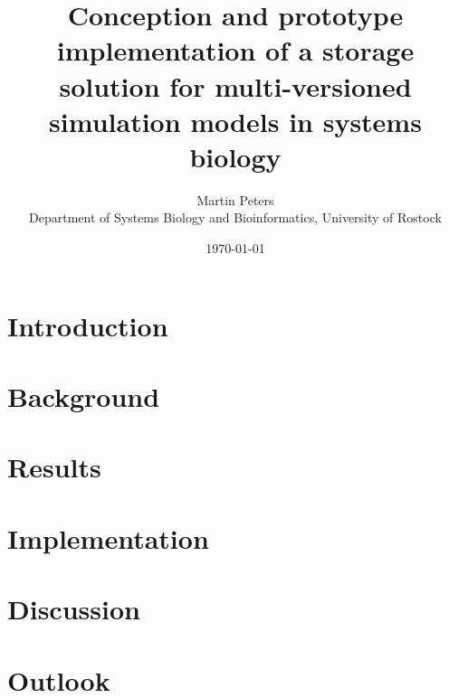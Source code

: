 \documentclass[12pt, a4paper, titlepage]{book}
\title{Conception and prototype implementation of a storage solution for multi-versioned simulation models in systems biology}
\author{Martin Peters\\ \small Department of Systems Biology and Bioinformatics, University of Rostock}
\date{\today}
\begin{document}
	\maketitle
	\tableofcontents
	
	\chapter{Introduction}
	
	
	\chapter{Background}
	
	
	\chapter{Results}
	
	
	\chapter{Implementation}
	
	
	\chapter{Discussion}
	
	
	\chapter{Outlook}
	
	
	
	
	
	\begin{appendix}
		\listoffigures
	\end{appendix}
\end{document}
